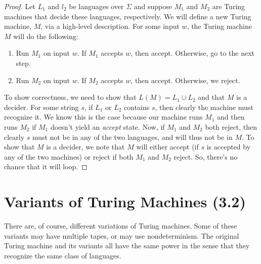 \documentclass[letterpaper]{article}
\begin{document}
\begin{mdframed}[nobreak=true]
    \begin{proof}
        Let $L_1$ and $l_2$ be languages over $\Sigma$ and suppose $M_1$ and $M_2$ are Turing machines that decide these languages, respectively. We will define a new Turing machine, $M$, via a high-level description. For some input $w$, the Turing machine $M$ will do the following: 
        \begin{enumerate}
            \item Run $M_1$ on input $w$. If $M_1$ accepts $w$, then accept. Otherwise, go to the next step. 
            \item Run $M_2$ on input $w$. If $M_2$ accepts $w$, then accept. Otherwise, we reject. 
        \end{enumerate} 
        To show correctness, we need to show that $L(M) = L_1 \cup L_2$ and that $M$ is a decider. For some string $s$, if $L_1$ or $L_2$ contains $s$, then clearly the machine must recognize it. We know this is the case because our machine runs $M_1$ and then runs $M_2$ if $M_1$ doesn't yield an \emph{accept} state. Now, if $M_1$ and $M_2$ both reject, then clearly $s$ must not be in any of the two languages, and will thus not be in $M$. To show that $M$ is a decider, we note that $M$ will either accept (if $s$ is accepted by any of the two machines) or reject if both $M_1$ and $M_2$ reject. So, there's no chance that it will loop.  
    \end{proof}
\end{mdframed}







\newpage 
\section{Variants of Turing Machines (3.2)}
There are, of course, different variations of Turing machines. Some of these variants may have multiple tapes, or may use nondeterminism. The original Turing machine and its variants all have the same power in the sense that they recognize the same class of languages. 
\end{document}
